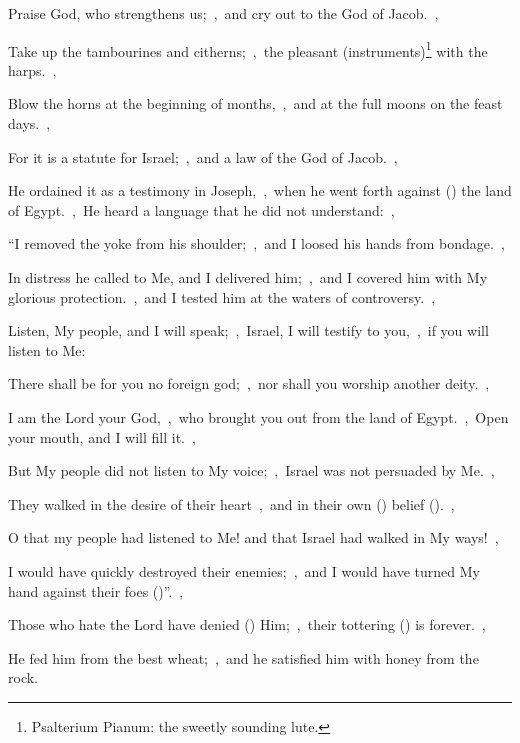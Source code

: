 \documentclass[12pt,twoside,a5paper]{article}
\begin{document}

\begin{normalparskip}
  Praise God, who strengthens us;~\sep\ and cry out to the God of Jacob.~\sep


  Take up the tambourines and citherns;~\sep\ the pleasant (instruments)\footnote{Psalterium Pianum: the sweetly sounding lute.} with the harps.~\sep

  Blow the horns at the beginning of months,~\sep\ and at the full moons on the feast days.~\sep

  For it is a statute for Israel;~\sep\ and a law of the God of Jacob.~\sep

  He ordained it as a testimony in Joseph,~\sep\ when he went forth against () the land of Egypt.~\sep\ He heard a language that he did not understand:~\sep

  ``I removed the yoke from his shoulder;~\sep\ and I loosed his hands from bondage.~\sep

  In distress he called to Me, and I delivered him;~\sep\ and I covered him with My glorious protection.~\sep\ and I tested him at the waters of controversy.~\sep

  Listen, My people, and I will speak;~\sep\ Israel, I will testify to you,~\sep\ if you will listen to Me:

  There shall be for you no foreign god;~\sep\ nor shall you worship another deity.~\sep

  I am the Lord your God,~\sep\ who brought you out from the land of Egypt.~\sep\ Open your mouth, and I will fill it.~\sep

  But My people did not listen to My voice;~\sep\ Israel was not persuaded by Me.~\sep

  They walked in the desire of their heart~\sep\ and in their own () belief ().~\sep

  O that my people had listened to Me! and that Israel had walked in My ways!~\sep

  I would have quickly destroyed their enemies;~\sep\ and I would have turned My hand against their foes ()''.~\sep

  Those who hate the Lord have denied () Him;~\sep\ their tottering () is forever.~\sep

  He fed him from the best wheat;~\sep\ and he satisfied him with honey from the rock.
\end{normalparskip}
\end{document}
